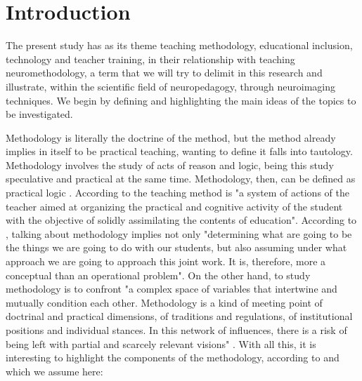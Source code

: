 \documentclass[english]{textolivre}
\begin{document}
\begin{polyabstract}
\begin{portuguese}
\begin{abstract}
\end{abstract}
\end{portuguese}
\end{polyabstract}

\section{Introduction}\label{sec-intro}
The present study has as its theme teaching methodology, educational inclusion, technology and teacher training, in their relationship with teaching neuromethodology, a term that we will try to delimit in this research and illustrate, within the scientific field of neuropedagogy, through neuroimaging techniques. We begin by defining and highlighting the main ideas of the topics to be investigated.

Methodology is literally the doctrine of the method, but the method already implies in itself to be practical teaching, wanting to define it falls into tautology. Methodology involves the study of acts of reason and logic, being this study speculative and practical at the same time. Methodology, then, can be defined as practical logic \cite[p. 1288]{varios_enciclopedia_1917}. According to \textcite[p. 320]{neuner_pedagogi_1981} the teaching method is "a system of actions of the teacher aimed at organizing the practical and cognitive activity of the student with the objective of solidly assimilating the contents of education". According to \textcite[p. 85]{zabalza_beraza_metodologidocente_2011}, talking about methodology implies not only "determining what are going to be the things we are going to do with our students, but also assuming under what approach we are going to approach this joint work. It is, therefore, more a conceptual than an operational problem". On the other hand, to study methodology is to confront "a complex space of variables that intertwine and mutually condition each other. Methodology is a kind of meeting point of doctrinal and practical dimensions, of traditions and regulations, of institutional positions and individual stances. In this network of influences, there is a risk of being left with partial and scarcely relevant visions" \textcite[p. 85]{zabalza_beraza_metodologidocente_2011}. With all this, it is interesting to highlight the components of the methodology, according to \textcite{zabalza_beraza_metodologidocente_2011} and which we assume here: 
\end{document}

